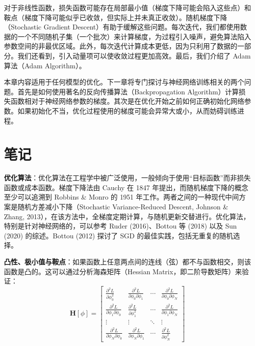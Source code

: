 对于非线性函数，损失函数可能存在局部最小值（梯度下降可能会陷入这些点）和鞍点（梯度下降可能似乎已收敛，但实际上并未真正收敛）。随机梯度下降（Stochastic Gradient Descent）有助于缓解这些问题。每次迭代，我们都使用数据的一个不同随机子集（一个批次）来计算梯度，为过程引入噪声，避免算法陷入参数空间的非最优区域。此外，每次迭代计算成本更低，因为只利用了数据的一部分。我们还看到，引入动量项可以使收敛过程更加高效。最后，我们介绍了 Adam 算法（Adam Algorithm）。

本章内容适用于任何模型的优化。下一章将专门探讨与神经网络训练相关的两个问题。首先是如何使用著名的反向传播算法（Backpropagation Algorithm）计算损失函数相对于神经网络参数的梯度。其次是在优化开始之前如何正确初始化网络参数。如果初始化不当，优化过程使用的梯度可能会异常大或小，从而妨碍训练进程。

\section{笔记}
\textbf{优化算法}：优化算法在工程学中被广泛使用，一般倾向于使用“目标函数”而非损失函数或成本函数。梯度下降法由 Cauchy 在 1847 年提出，而随机梯度下降的概念至少可以追溯到 Robbins \& Monro 的 1951 年工作。两者之间的一种现代中间方案是随机方差减小下降（Stochastic Variance-Reduced Descent, Johnson \& Zhang, 2013），在该方法中，全梯度定期计算，与随机更新交替进行。优化算法，特别是针对神经网络的，可以参考 Ruder (2016)、Bottou 等 (2018) 以及 Sun (2020) 的综述。Bottou (2012) 探讨了 SGD 的最佳实践，包括无重复的随机选择。

\textbf{凸性、极小值与鞍点}：如果函数上任意两点间的连线（弦）都不与函数相交，则该函数是凸的。这可以通过分析海森矩阵（Hessian Matrix，即二阶导数矩阵）来验证：
\begin{equation}
\mathbf{H}[\phi] = 
\begin{bmatrix}
\frac{\partial^2 L}{\partial \phi_0^2} & \frac{\partial^2 L}{\partial \phi_0 \partial \phi_1} & \cdots & \frac{\partial^2 L}{\partial \phi_0 \partial \phi_N} \\
\frac{\partial^2 L}{\partial \phi_1 \partial \phi_0} & \frac{\partial^2 L}{\partial \phi_1^2} & \cdots & \frac{\partial^2 L}{\partial \phi_1 \partial \phi_N} \\
\vdots & \vdots & \ddots & \vdots \\
\frac{\partial^2 L}{\partial \phi_N \partial \phi_0} & \frac{\partial^2 L}{\partial \phi_N \partial \phi_1} & \cdots & \frac{\partial^2 L}{\partial \phi_N^2}
\end{bmatrix}	
\end{equation}

